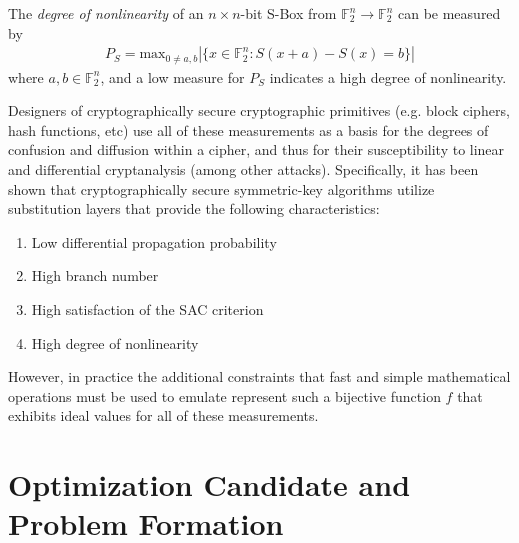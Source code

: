 \documentclass[11pt]{article}
\newcommand{\field}[1]{\mathbb{#1}} %
\begin{document}
\begin{define}
The \emph{degree of nonlinearity} of an $n \times n$-bit S-Box from $\field{F}_2^n \to \field{F}_2^n$ can be measured by
\begin{eqnarray*}
	P_S = \text{max}_{0 \not= a, b}|\{x \in \field{F}_2^n : S(x + a) - S(x) = b\}|
\end{eqnarray*}
where $a, b \in \field{F}_2^n$, and a low measure for $P_S$ indicates a high degree of nonlinearity.
\end{define}

Designers of cryptographically secure cryptographic primitives (e.g. block ciphers, hash functions, etc) use all of these measurements as a basis for the degrees of confusion and diffusion within a cipher, and thus for their susceptibility to linear and differential cryptanalysis (among other attacks). Specifically, it has been shown that cryptographically secure symmetric-key algorithms utilize substitution layers that provide the following characteristics:
\begin{enumerate}
	\item Low differential propagation probability
	\item High branch number
	\item High satisfaction of the SAC criterion
	\item High degree of nonlinearity
\end{enumerate}
However, in practice the additional constraints that fast and simple mathematical operations must be used to emulate represent such a bijective function $f$ that exhibits ideal values for all of these measurements.

\section{Optimization Candidate and Problem Formation}
\end{document}
